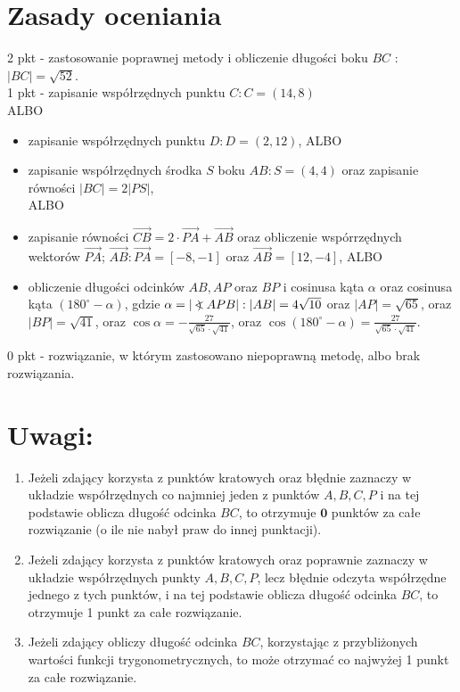 \documentclass[10pt]{article}
\newcommand\Varangle{\mathop{{<\!\!\!\!\!\text{\small)}}\:}\nolimits}
\begin{document}
\section*{Zasady oceniania}
2 pkt - zastosowanie poprawnej metody i obliczenie długości boku $B C$ : $|B C|=\sqrt{52}$.\\
1 pkt - zapisanie współrzędnych punktu $C: C=(14,8)$\\
ALBO

\begin{itemize}
  \item zapisanie współrzędnych punktu $D: D=(2,12)$, ALBO
  \item zapisanie współrzędnych środka $S$ boku $A B: S=(4,4)$ oraz zapisanie równości $|B C|=2|P S|$,\\
ALBO
  \item zapisanie równości $\overrightarrow{C B}=2 \cdot \overrightarrow{P A}+\overrightarrow{A B}$ oraz obliczenie wspórrzędnych wektorów $\overrightarrow{P A}$; $\overrightarrow{A B}: \overrightarrow{P A}=[-8,-1]$ oraz $\overrightarrow{A B}=[12,-4]$, ALBO
  \item obliczenie długości odcinków $A B, A P$ oraz $B P$ i cosinusa kąta $\alpha$ oraz cosinusa kąta $\left(180^{\circ}-\alpha\right)$, gdzie $\alpha=|\Varangle A P B|:|A B|=4 \sqrt{10}$ oraz $|A P|=\sqrt{65}$, oraz $|B P|=\sqrt{41}$, oraz $\cos \alpha=-\frac{27}{\sqrt{65} \cdot \sqrt{41}}$, oraz $\cos \left(180^{\circ}-\alpha\right)=\frac{27}{\sqrt{65} \cdot \sqrt{41}}$.
\end{itemize}

0 pkt - rozwiązanie, w którym zastosowano niepoprawną metodę, albo brak rozwiązania.

\section*{Uwagi:}
\begin{enumerate}
  \item Jeżeli zdający korzysta z punktów kratowych oraz błędnie zaznaczy w układzie współrzędnych co najmniej jeden z punktów $A, B, C, P$ i na tej podstawie oblicza długość odcinka $B C$, to otrzymuje $\mathbf{0}$ punktów za całe rozwiązanie (o ile nie nabył praw do innej punktacji).
  \item Jeżeli zdający korzysta z punktów kratowych oraz poprawnie zaznaczy w układzie współrzędnych punkty $A, B, C, P$, lecz błędnie odczyta współrzędne jednego z tych punktów, i na tej podstawie oblicza długość odcinka $B C$, to otrzymuje 1 punkt za całe rozwiązanie.
  \item Jeżeli zdający obliczy długość odcinka $B C$, korzystając z przybliżonych wartości funkcji trygonometrycznych, to może otrzymać co najwyżej 1 punkt za całe rozwiązanie.
\end{enumerate}
\end{document}

